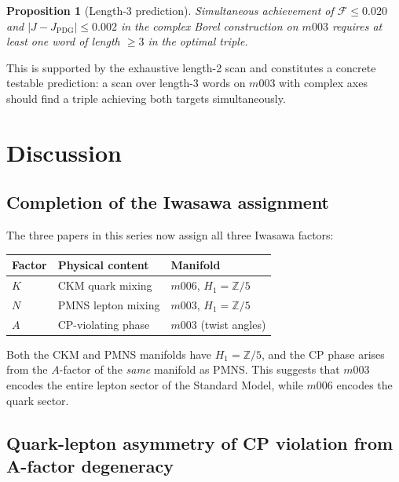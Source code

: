 \documentclass[floatfix,aps,prd,twocolumn,showpacs,superscriptaddress,longbibliography]{revtex4-2}
\newtheorem{proposition}{Proposition}
\begin{document}
\begin{proposition}[Length-3 prediction]
\label{prop:length3}
Simultaneous achievement of $\mathcal{F} \leq 0.020$ and
$|J - J_{\mathrm{PDG}}| \leq 0.002$ in the complex Borel
construction on $m003$ requires at least one word of length $\geq 3$
in the optimal triple.
\end{proposition}

This is supported by the exhaustive length-2 scan and constitutes
a concrete testable prediction: a scan over length-3 words on
$m003$ with complex axes should find a triple achieving both targets
simultaneously.

\section{Discussion}
\label{sec:discussion}

\subsection{Completion of the Iwasawa assignment}

The three papers in this series now assign all three Iwasawa factors:

\begin{center}
\begin{tabular}{lll}
\toprule
Factor & Physical content & Manifold \\
\midrule
$K$ & CKM quark mixing & $m006$, $H_1=\mathbb{Z}/5$ \\
$N$ & PMNS lepton mixing & $m003$, $H_1=\mathbb{Z}/5$ \\
$A$ & CP-violating phase & $m003$ (twist angles) \\
\bottomrule
\end{tabular}
\end{center}

Both the CKM and PMNS manifolds have $H_1 = \mathbb{Z}/5$,
and the CP phase arises from the $A$-factor of the \emph{same}
manifold as PMNS. This suggests that $m003$ encodes the entire
lepton sector of the Standard Model, while $m006$ encodes
the quark sector.

\subsection{Quark-lepton asymmetry of CP violation from A-factor degeneracy}
\label{sec:ckm_afactor}
\end{document}
